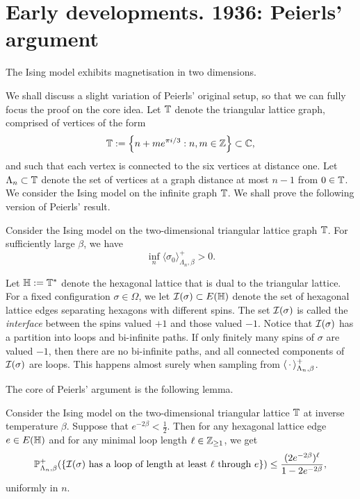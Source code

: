 \section{Early developments. 1936: Peierls' argument}
\label{sec:peierls}

\begin{theorem}[Peierls, 1936]
    \label{thm:peierls}
    The Ising model exhibits magnetisation in two dimensions.
\end{theorem}

We shall discuss a slight variation of Peierls' original setup,
so that we can fully focus the proof on the core idea.
Let $\mathbb T$ denote the triangular lattice graph,
comprised of vertices of the form
\[
    \mathbb T:=\left\{n+m e^{\pi i/3}:n,m\in\mathbb Z \right\}\subset\mathbb C,
\]
and such that each vertex is connected to the six
vertices at distance one.
Let $\Lambda_n\subset\mathbb T$ denote the set of vertices at a graph
distance at most $n-1$ from $0\in\mathbb T$.
We consider the Ising model on the infinite graph $\mathbb T$.
We shall prove the following version of Peierls' result.

\begin{theorem}[Peierls, 1936]
    \label{thm:peierls_triangles}
    Consider the Ising model on the two-dimensional
    triangular lattice graph $\mathbb T$.
    For sufficiently large $\beta$,
    we have
    \[
        \inf_{n}\langle\sigma_0\rangle_{\Lambda_n,\beta}^+
        >0.
    \]
\end{theorem}

Let $\mathbb H:=\mathbb T^*$ denote the hexagonal lattice
that is dual to the triangular lattice.
For a fixed configuration $\sigma\in\Omega$,
we let $\mathcal I(\sigma)\subset E(\mathbb H)$ denote the set of
hexagonal lattice edges separating hexagons with different spins.
The set $\mathcal I(\sigma)$ is called the
\emph{interface} between the spins valued $+1$
and those valued $-1$.
Notice that $\mathcal I(\sigma)$ has a partition into
loops and bi-infinite paths.
If only finitely many spins of $\sigma$ are valued $-1$,
then there are no bi-infinite paths,
and all connected components of $\mathcal I(\sigma)$
are loops.
This happens almost surely when sampling from $\langle\,\cdot\,\rangle_{\Lambda_n,\beta}^+$.

The core of Peierls' argument is the following lemma.

\begin{lemma}
    \label{lem:exp_decay_ising_loops}
    Consider the Ising model on the two-dimensional triangular lattice $\mathbb T$
    at inverse temperature $\beta$.
    Suppose that $e^{-2\beta}<\frac12$.
    Then for any hexagonal lattice edge $e\in E(\mathbb H)$
    and for any minimal loop length $\ell\in\mathbb Z_{\geq 1}$,
    we get
    \[
        \P_{\Lambda_n,\beta}^+
        (\{\text{$\calI(\sigma)$ has a loop of length at least $\ell$ through $e$}\})
        \leq \frac{(2e^{-2\beta})^\ell}{1-2e^{-2\beta}},
    \]
    uniformly in $n$.
\end{lemma}

